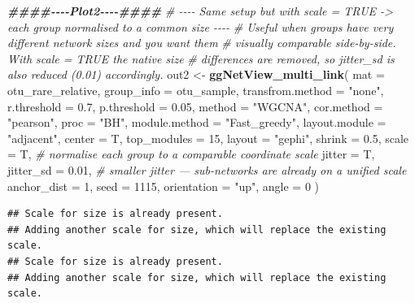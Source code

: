 \documentclass[
]{book}
\newenvironment{Shaded}{\begin{snugshade}}{\end{snugshade}}
\newcommand{\AttributeTok}[1]{\textcolor[rgb]{0.13,0.29,0.53}{#1}}
\newcommand{\CommentTok}[1]{\textcolor[rgb]{0.56,0.35,0.01}{\textit{#1}}}
\newcommand{\DecValTok}[1]{\textcolor[rgb]{0.00,0.00,0.81}{#1}}
\newcommand{\DocumentationTok}[1]{\textcolor[rgb]{0.56,0.35,0.01}{\textbf{\textit{#1}}}}
\newcommand{\FloatTok}[1]{\textcolor[rgb]{0.00,0.00,0.81}{#1}}
\newcommand{\FunctionTok}[1]{\textcolor[rgb]{0.13,0.29,0.53}{\textbf{#1}}}
\newcommand{\NormalTok}[1]{#1}
\newcommand{\OtherTok}[1]{\textcolor[rgb]{0.56,0.35,0.01}{#1}}
\newcommand{\StringTok}[1]{\textcolor[rgb]{0.31,0.60,0.02}{#1}}
\begin{document}
\begin{Shaded}
\begin{Highlighting}[]
\DocumentationTok{\#\#\#\#{-}{-}{-}{-}Plot2{-}{-}{-}{-}\#\#\#\#}
\CommentTok{\# {-}{-}{-}{-} Same setup but with \textasciigrave{}scale = TRUE\textasciigrave{} {-}\textgreater{} each group normalised to a common size {-}{-}{-}{-}}
\CommentTok{\# Useful when groups have very different network sizes and you want them}
\CommentTok{\# visually comparable side{-}by{-}side. With \textasciigrave{}scale = TRUE\textasciigrave{} the native size}
\CommentTok{\# differences are removed, so jitter\_sd is also reduced (0.01) accordingly.}
\NormalTok{out2 }\OtherTok{\textless{}{-}} \FunctionTok{ggNetView\_multi\_link}\NormalTok{(}
  \AttributeTok{mat              =}\NormalTok{ otu\_rare\_relative,}
  \AttributeTok{group\_info       =}\NormalTok{ otu\_sample,}
  \AttributeTok{transfrom.method =} \StringTok{"none"}\NormalTok{,}
  \AttributeTok{r.threshold      =} \FloatTok{0.7}\NormalTok{,}
  \AttributeTok{p.threshold      =} \FloatTok{0.05}\NormalTok{,}
  \AttributeTok{method           =} \StringTok{"WGCNA"}\NormalTok{,}
  \AttributeTok{cor.method       =} \StringTok{"pearson"}\NormalTok{,}
  \AttributeTok{proc             =} \StringTok{"BH"}\NormalTok{,}
  \AttributeTok{module.method    =} \StringTok{"Fast\_greedy"}\NormalTok{,}
  \AttributeTok{layout.module    =} \StringTok{"adjacent"}\NormalTok{,}
  \AttributeTok{center           =}\NormalTok{ T,}
  \AttributeTok{top\_modules      =} \DecValTok{15}\NormalTok{,}
  \AttributeTok{layout           =} \StringTok{"gephi"}\NormalTok{,}
  \AttributeTok{shrink           =} \FloatTok{0.5}\NormalTok{,}
  \AttributeTok{scale            =}\NormalTok{ T,                 }\CommentTok{\# normalise each group to a comparable coordinate scale}
  \AttributeTok{jitter           =}\NormalTok{ T,}
  \AttributeTok{jitter\_sd        =} \FloatTok{0.01}\NormalTok{,              }\CommentTok{\# smaller jitter — sub{-}networks are already on a unified scale}
  \AttributeTok{anchor\_dist      =} \DecValTok{1}\NormalTok{,}
  \AttributeTok{seed             =} \DecValTok{1115}\NormalTok{,}
  \AttributeTok{orientation      =} \StringTok{"up"}\NormalTok{,}
  \AttributeTok{angle            =} \DecValTok{0}
\NormalTok{)}
\end{Highlighting}
\end{Shaded}

\begin{verbatim}
## Scale for size is already present.
## Adding another scale for size, which will replace the existing scale.
## Scale for size is already present.
## Adding another scale for size, which will replace the existing scale.
\end{verbatim}
\end{document}
